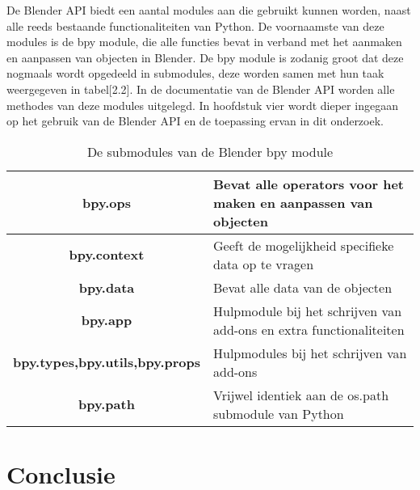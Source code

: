 \par
De Blender API biedt een aantal modules aan die gebruikt kunnen worden, naast alle reeds bestaande functionaliteiten van Python. De voornaamste van deze modules is de bpy module, die alle functies bevat in verband met het aanmaken en aanpassen van objecten in Blender. De bpy module is zodanig groot dat deze nogmaals wordt opgedeeld in submodules, deze worden samen met hun taak weergegeven in tabel[2.2]. In de documentatie van de Blender API worden alle methodes van deze modules uitgelegd. In hoofdstuk vier wordt dieper ingegaan op het gebruik van de Blender API en de toepassing ervan in dit onderzoek.

\begin{table}[]
\begin{center}
\begin{tabular}{|c|l|}
\hline
\textbf{bpy.ops}                       & Bevat alle operators voor het maken en aanpassen van objecten       \\ \hline
\textbf{bpy.context}                   & Geeft de mogelijkheid specifieke data op te vragen                  \\ \hline
\textbf{bpy.data}                      & Bevat alle data van de objecten                                     \\ \hline
\textbf{bpy.app}                       & Hulpmodule bij het schrijven van add-ons en extra functionaliteiten \\ \hline
\textbf{bpy.types,bpy.utils,bpy.props} & Hulpmodules bij het schrijven van add-ons                           \\ \hline
\textbf{bpy.path}                      & Vrijwel identiek aan de os.path submodule van Python                \\ \hline
\end{tabular}
\caption{De submodules van de Blender bpy module \citep*{API1}}
\end{center}
\end{table}


\section{Conclusie}

